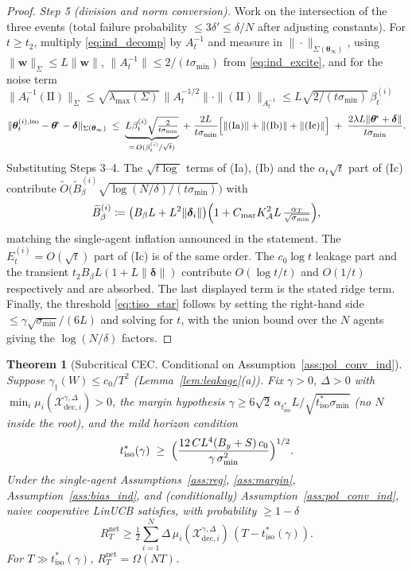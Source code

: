\documentclass[11pt]{article}
\newtheorem{theorem}{Theorem}[section]
\newcommand{\Ot}{\widetilde{O}}
\begin{document}
\begin{proof}
\emph{Step 5 (division and norm conversion).}  Work on the
intersection of the three events (total failure probability
$\leq 3\delta'\leq\delta/N$ after adjusting constants).  For
$t\geq t_2$, multiply \eqref{eq:ind_decomp} by $A_t^{-1}$ and measure
in $\|\cdot\|_{\Sigma(\bm\theta_\infty)}$, using
$\|\bm w\|_{\Sigma}\leq L\|\bm w\|$,
$\|A_t^{-1}\|\leq 2/(t\sigma_{\min})$ from \eqref{eq:ind_excite}, and
for the noise term
$\|A_t^{-1}(\mathrm{II})\|_{\Sigma}
\leq\sqrt{\lambda_{\max}(\Sigma)}\,\|A_t^{-1/2}\|\cdot
\|(\mathrm{II})\|_{A_t^{-1}}
\leq L\sqrt{2/(t\sigma_{\min})}\,\beta_t^{(i)}$ \[
\|\bm\theta_t^{(i),\mathrm{iso}}-\bm\theta^{\!*}-\bm\delta\|_{\Sigma(\bm\theta_\infty)}
\;\leq\;
\underbrace{L\beta_t^{(i)}\sqrt{\tfrac{2}{t\sigma_{\min}}}}_{=\,O(\beta_t^{(i)}/\sqrt t)}
\;+\;\frac{2L}{t\sigma_{\min}}
\Bigl[\|(\mathrm{Ia})\|+\|(\mathrm{Ib})\|+\|(\mathrm{Ic})\|\Bigr]
\;+\;\frac{2\lambda L\|\bm\theta^{\!*}+\bm\delta\|}{t\sigma_{\min}} .
\]
Substituting Steps 3--4. The $\sqrt{t\log}$ terms of (Ia), (Ib) and
the $\alpha_t\sqrt t$ part of (Ic) contribute
$\Ot\bigl(\widetilde B_\beta^{(i)}\sqrt{\log(N/\delta)/(t\sigma_{\min})}\bigr)$
with
\[
\widetilde B_\beta^{(i)}\coloneqq
\bigl(B_\beta L+L^2\|\bm\delta_i\|\bigr)
\Bigl(1+C_{\mathrm{mar}}K_{\mathcal A}^2 L\,
\tfrac{\alpha_T}{\sqrt{\sigma_{\min}}}\Bigr),
\]
matching the single-agent inflation announced in the statement. The
$E_t^{(i)}=O(\sqrt t)$ part of (Ic) is of the same order. The
$c_0\log t$ leakage part and the transient
$t_2 B_\beta L(1+L\|\bm\delta\|)$ contribute $O(\log t/t)$ and
$O(1/t)$ respectively and are absorbed. The last displayed term is the stated
ridge term.  Finally, the threshold \eqref{eq:tiso_star} follows by
setting the right-hand side $\leq\gamma\sqrt{\sigma_{\min}}/(6L)$ and
solving for $t$, with the union bound over the $N$ agents giving the
$\log(N/\delta)$ factors.
\end{proof}

\begin{theorem}[Subcritical CEC. Conditional on
Assumption~\ref{ass:pol_conv_ind}]
\label{thm:cec_sub}
Suppose $\gamma_\dagger(W)\leq c_0/T^2$
(Lemma~\ref{lem:leakage}(a)).
Fix $\gamma>0$, $\Delta>0$ with
$\min_i\mu_i(\mathcal{X}_{\mathrm{dec},i}^{\gamma,\Delta})>0$, the
margin hypothesis
$\gamma\geq 6\sqrt2\,\alpha_{t_{\mathrm{iso}}^*}L/\sqrt{t_{\mathrm{iso}}^*\sigma_{\min}}$
(no $N$ inside the root), and the mild horizon condition
\begin{equation}
t_{\mathrm{iso}}^*(\gamma)\;\geq\;
\Bigl(\frac{12\,C L^4 (B_y+S)\,c_0}{\gamma\,\sigma_{\min}^{2}}\Bigr)^{1/2}.
\label{eq:leak_horizon}
\end{equation}
Under the single-agent Assumptions~\ref{ass:reg}, \ref{ass:margin},
Assumption~\ref{ass:bias_ind}, and (conditionally)
Assumption~\ref{ass:pol_conv_ind},
naive cooperative LinUCB satisfies, with probability $\geq 1-\delta$ \begin{equation}
R_T^{\mathrm{net}}\geq\tfrac12\sum_{i=1}^N\Delta\,
\mu_i(\mathcal{X}_{\mathrm{dec},i}^{\gamma,\Delta})\,(T-t_{\mathrm{iso}}^*(\gamma)).
\label{eq:cec_sub}
\end{equation}
For $T\gg t_{\mathrm{iso}}^*(\gamma)$, $R_T^{\mathrm{net}}=\Omega(NT)$.
\end{theorem}
\end{document}
